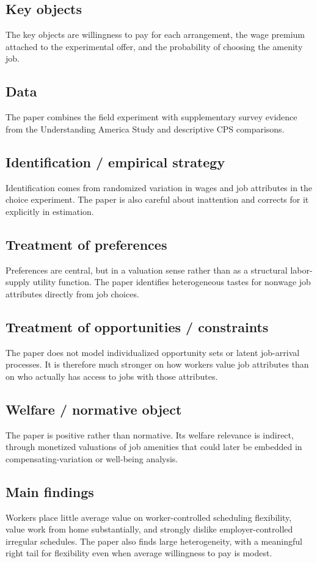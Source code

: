 \documentclass[11pt,a4paper]{article}
\begin{document}
\subsection*{Key objects}
The key objects are willingness to pay for each arrangement, the wage premium attached to the experimental offer, and the probability of choosing the amenity job.

\subsection*{Data}
The paper combines the field experiment with supplementary survey evidence from the Understanding America Study and descriptive CPS comparisons.

\subsection*{Identification / empirical strategy}
Identification comes from randomized variation in wages and job attributes in the choice experiment. The paper is also careful about inattention and corrects for it explicitly in estimation.

\subsection*{Treatment of preferences}
Preferences are central, but in a valuation sense rather than as a structural labor-supply utility function. The paper identifies heterogeneous tastes for nonwage job attributes directly from job choices.

\subsection*{Treatment of opportunities / constraints}
The paper does not model individualized opportunity sets or latent job-arrival processes. It is therefore much stronger on how workers value job attributes than on who actually has access to jobs with those attributes.

\subsection*{Welfare / normative object}
The paper is positive rather than normative. Its welfare relevance is indirect, through monetized valuations of job amenities that could later be embedded in compensating-variation or well-being analysis.

\subsection*{Main findings}
Workers place little average value on worker-controlled scheduling flexibility, value work from home substantially, and strongly dislike employer-controlled irregular schedules. The paper also finds large heterogeneity, with a meaningful right tail for flexibility even when average willingness to pay is modest.
\end{document}
